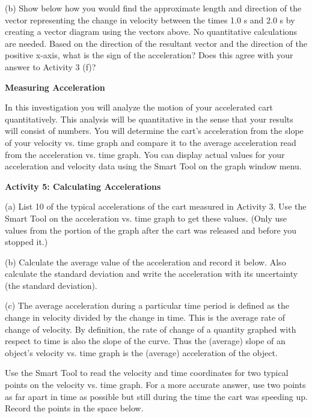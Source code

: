 (b) Show below how you would find the approximate length and direction of the
vector representing the change in velocity between the times 1.0 s and 2.0 s
by creating a vector diagram using the vectors above. No quantitative 
calculations are needed. Based on the direction of the resultant vector and 
the direction of the positive x-axis, what is the sign of the acceleration? 
Does this agree with your answer to Activity 3 (f)?
\vspace{20mm}

\textbf{Measuring Acceleration }

In this investigation you will analyze the motion of your accelerated cart quantitatively.
This analysis will be quantitative in the sense that your results will consist
of numbers. You will determine the cart's acceleration from the slope of your
velocity vs. time graph and compare it to the average acceleration read from
the acceleration vs. time graph. You can display actual values for your acceleration
and velocity data using the Smart Tool on the graph window menu.

\textbf{Activity 5: Calculating Accelerations} 

(a) List 10 of the typical accelerations of the cart measured in Activity 3.
Use the Smart Tool on the acceleration vs. time graph to get these values. (Only
use values from the portion of the graph after the cart was released and before
you stopped it.)
\vspace{20mm}

(b) Calculate the average value of the acceleration and record it below.  Also calculate the standard deviation and write the acceleration with its uncertainty (the standard deviation).
\vspace{30mm}

(c) The average acceleration during a particular time period is defined as the
change in velocity divided by the change in time. This is the average rate of
change of velocity. By definition, the rate of change of a quantity graphed
with respect to time is also the slope of the curve. Thus the (average) slope
of an object's velocity vs. time graph is the (average) acceleration of the
object.

Use the Smart Tool to read the velocity and time coordinates for two typical
points on the velocity vs. time graph. For a more accurate answer, use two points as far apart in time as possible but still during the time the cart was speeding up. Record the points in the space below.
\vspace{20mm}

